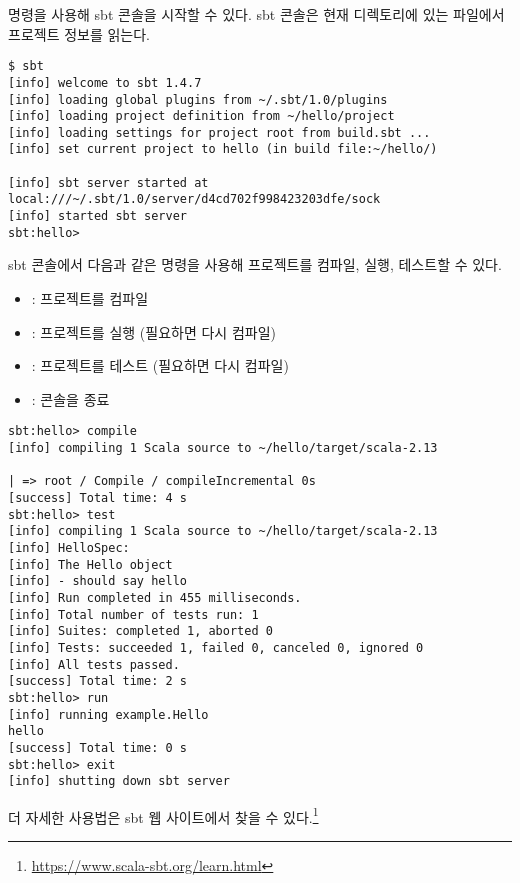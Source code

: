  명령을 사용해 sbt 콘솔을 시작할 수 있다. sbt 콘솔은 현재 디렉토리에
있는  파일에서 프로젝트 정보를 읽는다.

\begin{verbatim}
$ sbt
[info] welcome to sbt 1.4.7
[info] loading global plugins from ~/.sbt/1.0/plugins
[info] loading project definition from ~/hello/project
[info] loading settings for project root from build.sbt ...
[info] set current project to hello (in build file:~/hello/)

[info] sbt server started at
local:///~/.sbt/1.0/server/d4cd702f998423203dfe/sock
[info] started sbt server
sbt:hello>
\end{verbatim}

sbt 콘솔에서 다음과 같은 명령을 사용해 프로젝트를 컴파일, 실행, 테스트할 수
있다.

\begin{itemize}
  \item {}: 프로젝트를 컴파일
  \item {}: 프로젝트를 실행 (필요하면 다시 컴파일)
  \item {}: 프로젝트를 테스트 (필요하면 다시 컴파일)
  \item {}: 콘솔을 종료
\end{itemize}

\begin{verbatim}
sbt:hello> compile
[info] compiling 1 Scala source to ~/hello/target/scala-2.13

| => root / Compile / compileIncremental 0s
[success] Total time: 4 s
sbt:hello> test
[info] compiling 1 Scala source to ~/hello/target/scala-2.13
[info] HelloSpec:
[info] The Hello object
[info] - should say hello
[info] Run completed in 455 milliseconds.
[info] Total number of tests run: 1
[info] Suites: completed 1, aborted 0
[info] Tests: succeeded 1, failed 0, canceled 0, ignored 0
[info] All tests passed.
[success] Total time: 2 s
sbt:hello> run
[info] running example.Hello
hello
[success] Total time: 0 s
sbt:hello> exit
[info] shutting down sbt server
\end{verbatim}

더 자세한 사용법은 sbt 웹 사이트에서 찾을 수 있다.\footnote{\url{https://www.scala-sbt.org/learn.html}}
